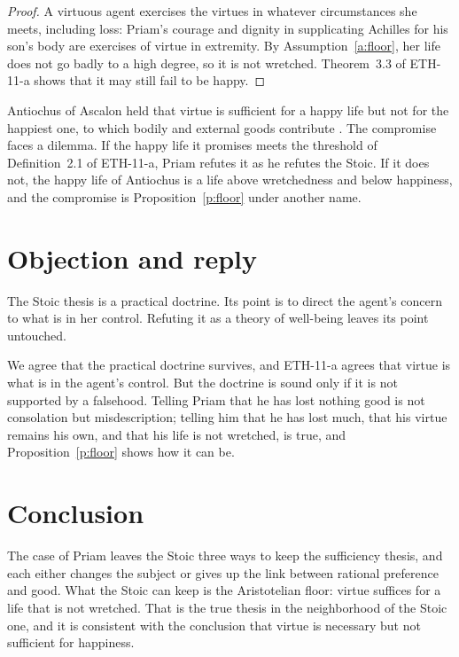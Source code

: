 \documentclass{situationist-preprint}
\begin{document}
\begin{proof}
A virtuous agent exercises the virtues in whatever circumstances she meets, including loss: Priam's courage and dignity in supplicating Achilles for his son's body are exercises of virtue in extremity. By Assumption~\ref{a:floor}, her life does not go badly to a high degree, so it is not wretched. Theorem~3.3 of ETH-11-a shows that it may still fail to be happy.
\end{proof}

Antiochus of Ascalon held that virtue is sufficient for a happy life but not for the happiest one, to which bodily and external goods contribute \citep[V]{CiceroFin}. The compromise faces a dilemma. If the happy life it promises meets the threshold of Definition~2.1 of ETH-11-a, Priam refutes it as he refutes the Stoic. If it does not, the happy life of Antiochus is a life above wretchedness and below happiness, and the compromise is Proposition~\ref{p:floor} under another name.

\section{Objection and reply}

\begin{objection}
The Stoic thesis is a practical doctrine. Its point is to direct the agent's concern to what is in her control. Refuting it as a theory of well-being leaves its point untouched.
\end{objection}

\begin{reply}
We agree that the practical doctrine survives, and ETH-11-a agrees that virtue is what is in the agent's control. But the doctrine is sound only if it is not supported by a falsehood. Telling Priam that he has lost nothing good is not consolation but misdescription; telling him that he has lost much, that his virtue remains his own, and that his life is not wretched, is true, and Proposition~\ref{p:floor} shows how it can be.
\end{reply}

\section{Conclusion}

The case of Priam leaves the Stoic three ways to keep the sufficiency thesis, and each either changes the subject or gives up the link between rational preference and good. What the Stoic can keep is the Aristotelian floor: virtue suffices for a life that is not wretched. That is the true thesis in the neighborhood of the Stoic one, and it is consistent with the conclusion that virtue is necessary but not sufficient for happiness.
\end{document}
